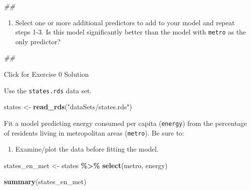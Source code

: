 \documentclass[
]{book}
\newenvironment{Shaded}{\begin{snugshade}}{\end{snugshade}}
\newcommand{\CommentTok}[1]{\textcolor[rgb]{0.56,0.35,0.01}{\textit{#1}}}
\newcommand{\KeywordTok}[1]{\textcolor[rgb]{0.13,0.29,0.53}{\textbf{#1}}}
\newcommand{\NormalTok}[1]{#1}
\newcommand{\OperatorTok}[1]{\textcolor[rgb]{0.81,0.36,0.00}{\textbf{#1}}}
\newcommand{\StringTok}[1]{\textcolor[rgb]{0.31,0.60,0.02}{#1}}
\providecommand{\tightlist}{%
  \setlength{\itemsep}{0pt}\setlength{\parskip}{0pt}}
\begin{document}
\begin{Shaded}
\begin{Highlighting}[]
\CommentTok{\#\# }
\end{Highlighting}
\end{Shaded}

\begin{enumerate}
\def\labelenumi{\arabic{enumi}.}
\setcounter{enumi}{3}
\tightlist
\item
  Select one or more additional predictors to add to your model and repeat steps 1-3. Is this model significantly better than the model with \texttt{metro} as the only predictor?
\end{enumerate}

\begin{Shaded}
\begin{Highlighting}[]
\CommentTok{\#\# }
\end{Highlighting}
\end{Shaded}

{Click for Exercise 0 Solution}

Use the \texttt{states.rds} data set.

\begin{Shaded}
\begin{Highlighting}[]
\NormalTok{  states \textless{}{-}}\StringTok{ }\KeywordTok{read\_rds}\NormalTok{(}\StringTok{"dataSets/states.rds"}\NormalTok{)}
\end{Highlighting}
\end{Shaded}

Fit a model predicting energy consumed per capita (\texttt{energy}) from the percentage of residents living in metropolitan areas (\texttt{metro}). Be sure to:

\begin{enumerate}
\def\labelenumi{\arabic{enumi}.}
\tightlist
\item
  Examine/plot the data before fitting the model.
\end{enumerate}

\begin{Shaded}
\begin{Highlighting}[]
\NormalTok{  states\_en\_met \textless{}{-}}\StringTok{ }
\StringTok{      }\NormalTok{states }\OperatorTok{\%\textgreater{}\%}\StringTok{ }
\StringTok{      }\KeywordTok{select}\NormalTok{(metro, energy)}

  \KeywordTok{summary}\NormalTok{(states\_en\_met)}
\end{Highlighting}
\end{Shaded}
\end{document}
